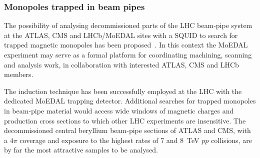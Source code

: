 \subsubsection{Monopoles trapped in beam pipes}\label{sc:pipes}

The possibility of analysing decommissioned parts of the LHC beam-pipe system at the ATLAS, CMS and LHCb/MoEDAL sites with a SQUID to search for trapped magnetic monopoles has been proposed~\cite{beampipe-proposal}. In this context the MoEDAL experiment may serve as a formal platform for coordinating machining, scanning and analysis work, in collaboration with interested ATLAS, CMS and LHCb members. 

The induction technique has been successfully employed at the LHC with the dedicated MoEDAL trapping detector. Additional searches for trapped monopoles in beam-pipe material would access wide windows of magnetic charges and production cross sections to which other LHC experiments are insensitive. The decommissioned central beryllium beam-pipe sections of ATLAS and CMS, with a $4\pi$ coverage and exposure to the highest rates of 7 and 8~TeV $pp$ collisions, are by far the most attractive samples to be analysed.
